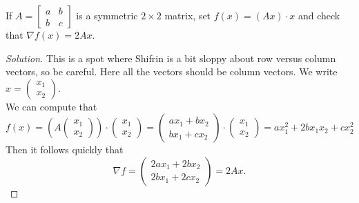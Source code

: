 \documentclass[Shifrin_Solutions_Spring_2015.tex]{subfiles}
\begin{document}
\vspace{1cm}


\begin{exercise} If $A = \begin{bmatrix} a & b \\ b & c \end{bmatrix}$ is a symmetric $2 \times 2$ matrix, set $f(x) = (Ax) \cdot x$ and check that $\nabla f (x) = 2 A x$.
 \end{exercise}

\begin{proof}[Solution] This is a spot where Shifrin is a bit sloppy about row versus column vectors, so be careful. Here all the vectors should be column vectors. We write $x = \begin{pmatrix} x_1 \\ x_2 \end{pmatrix}$.\\
We can compute that
\[
f(x) =\left( A \begin{pmatrix} x_1 \\ x_2 \end{pmatrix}\right) \cdot \begin{pmatrix} x_1 \\ x_2 \end{pmatrix}= \begin{pmatrix} ax_1+bx_2 \\ bx_1 + cx_2 \end{pmatrix} \cdot \begin{pmatrix} x_1 \\ x_2 \end{pmatrix} =  a x_1^2 + 2b x_1x_2 + cx_2^2
\]
 Then it follows quickly that
\[
\nabla f = \begin{pmatrix} 2ax_1 + 2bx_2 \\ 2bx_1 + 2cx_2 \end{pmatrix} = 2 Ax .
\]
\end{proof}
\end{document}
